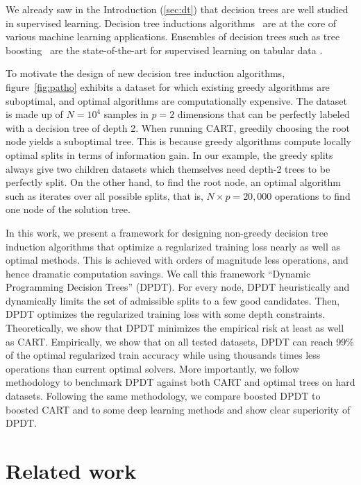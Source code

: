 We already saw in the Introduction (\ref{sec:dt}) that decision trees are well studied in supervised learning.
Decision tree inductions algorithms~\cite{ID3,c45,breiman1984classification} are at the core of various machine learning applications. 
Ensembles of decision trees such as tree boosting~\cite{stcohFriedman,FriedmanBoosting,xgb,10.5555/3327757.3327770} are the state-of-the-art for supervised learning on tabular data \cite{grinsztajn2022tree}.

To motivate the design of new decision tree induction algorithms, figure~\ref{fig:patho} exhibits a dataset for which existing greedy algorithms are suboptimal, and optimal algorithms are computationally expensive. 
The dataset is made up of $N=10^4$ samples in $p=2$ dimensions that can be perfectly labeled with a decision tree of depth 2. When running CART, greedily choosing the root node yields a suboptimal tree.
This is because greedy algorithms compute locally optimal splits in terms of information gain. In our example, the greedy splits always give two children datasets which themselves need depth-2 trees to be perfectly split.
On the other hand, to find the root node, an optimal algorithm such as \cite{quantbnb} iterates over all possible splits, that is, $N\times p={20,000}$ operations to find one node of the solution tree.

In this work, we present a framework for designing non-greedy decision tree induction algorithms that optimize a regularized training loss nearly as well as optimal methods. This is achieved with orders of magnitude less operations, and hence dramatic computation savings.
We call this framework ``Dynamic Programming Decision Trees'' (DPDT). For every node, DPDT heuristically and dynamically limits the set of admissible splits to a few good candidates. Then, DPDT optimizes the regularized training loss with some depth constraints.
Theoretically, we show that DPDT minimizes the empirical risk at least as well as CART\@.
Empirically, we show that on all tested datasets, DPDT can reach 99\% of the optimal regularized train accuracy while using thousands times less operations than current optimal solvers. 
More importantly, we follow \cite{grinsztajn2022tree} methodology to benchmark DPDT against both CART and optimal trees on hard datasets. Following the same methodology, we compare boosted DPDT \cite{FREUND1997119} to boosted CART and to some deep learning methods and show clear superiority of DPDT.

\section{Related work}

